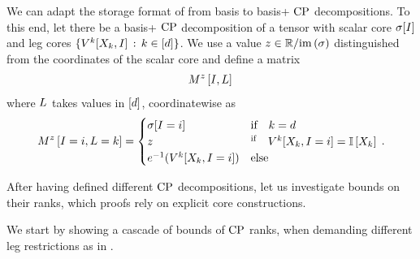 \begin{remark}
    \label{rem:matStorageBasPlus}
    We can adapt the storage format of  from basis to basis+ $\mathrm{CP}$ decompositions.
    To this end, let there be a basis+ $\mathrm{CP}$ decomposition of a tensor with scalar core $\sigma[I]$ and leg cores $\{V^{k}[X_{k},I] \, : \, k\in[d]\}$.
    We use a value $z\in\mathbb{R}/\mathrm{im}\left(\sigma\right)$ distinguished from the coordinates of the scalar core and define a matrix
    \begin{align*}
        M^{z}\left[I,L\right] \,
    \end{align*}
    where $L$ takes values in $[d]$, coordinatewise as
    \begin{align*}
        M^{z}\left[I=i,L=k\right] =
        \begin{cases}
            \sigma[I=i] & \text{if} \quad k = d \\
            z & ^\text{if} \quad V^{k}[X_{k},I=i] = \mathbb{I}\left[X_{k}\right] \\
            e^{-1}(V^{k}[X_{k},I=i]) & \text{else}
        \end{cases} \, .
    \end{align*}
\end{remark}




After having defined different $\mathrm{CP}$ decompositions, let us investigate bounds on their ranks, which proofs rely on explicit core constructions.




We start by showing a cascade of bounds of $\mathrm{CP}$ ranks, when demanding different leg restrictions as in .

